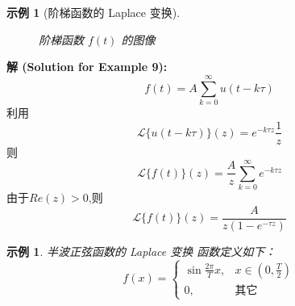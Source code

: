 \documentclass[linespread=1.5,openany]{book}%
\theoremstyle{plain}
\newtheorem{example}[theorem]{示例}
\begin{document}
{{{{{{\begin{example}[阶梯函数的 Laplace 变换]
\begin{figure}[htbp]
										\caption{阶梯函数 $f(t)$ 的图像 }
										\label{fig:L15_staircase_fig1}
									\end{figure}
								\end{example}
								\noindent\textbf{解 (Solution for Example 9):} \\
								\[	f(t) = A \sum_{k=0}^{\infty} u(t-k\tau) \]
								利用
								\[\mathcal{L}\{u(t-k\tau)\}(z)=e^{-k\tau z} \frac{1}{z}\]
								则
								\[\mathcal{L}\{f(t)\}(z) = \frac{A}{z}\sum_{k=0}^{\infty} e^{-k\tau z}\]
								由于$Re(z)>0$,则
								\[\mathcal{L}\{f(t)\}(z) = \frac{A}{z(1-e^{-\tau z})}\]
								\vspace{\baselineskip}
								
								\begin{example}{半波正弦函数的 Laplace 变换}
									函数定义如下：
									\begin{equation}
										f(x) = 
										\begin{cases}
											\sin \frac{2\pi}{T}x, & x \in (0, \frac{T}{2}) \\
											0, & \text{其它}
										\end{cases}
									\end{equation}
								\end{example}
								
}}}}}}
\end{document}
